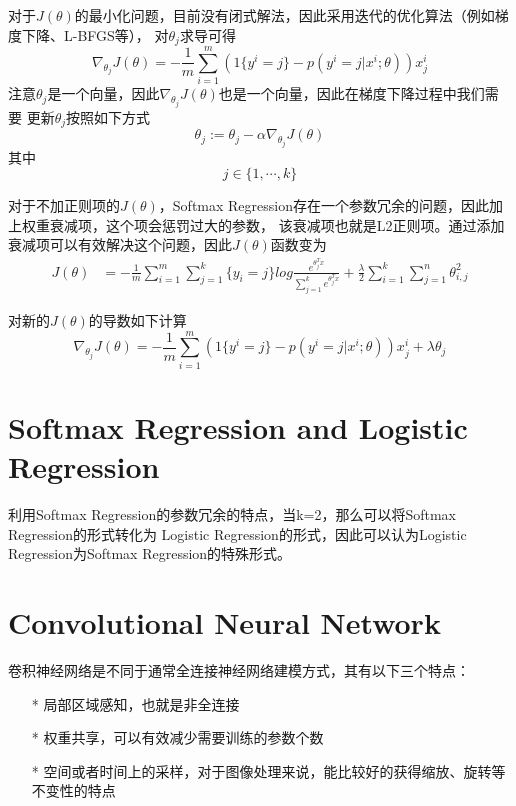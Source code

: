 \documentclass[UTF8]{ctexart}
\begin{document}
\par
对于$J(\theta)$的最小化问题，目前没有闭式解法，因此采用迭代的优化算法（例如梯度下降、L-BFGS等），
对$\theta_j$求导可得
\[ \nabla_{\theta_j}J(\theta) = -\frac{1}{m} \sum_{i=1}^m (1\{y^i=j\}-p(y^i=j|x^i;\theta))x_j^i \]
注意$\theta_j$是一个向量，因此$\nabla_{\theta_j}J(\theta)$也是一个向量，因此在梯度下降过程中我们需要
更新$\theta_j$按照如下方式
\[ \theta_j := \theta_j - \alpha \nabla_{\theta_j} J(\theta) \]
其中\[j \in \{1, \cdots, k\}\]

\par
对于不加正则项的$J(\theta)$，Softmax Regression存在一个参数冗余的问题，因此加上权重衰减项，这个项会惩罚过大的参数，
该衰减项也就是L2正则项。通过添加衰减项可以有效解决这个问题，因此$J(\theta)$函数变为
\begin{align}
J(\theta) &= 
-\frac{1}{m} \sum_{i=1}^m \sum_{j=1}^k \{y_i=j\} log \frac{e^{\theta_j^T x}}{\sum_{j=1}^k e^{\theta_j^T x}}
+ \frac{\lambda}{2} \sum_{i=1}^k \sum_{j=1}^n \theta_{i,j}^2
\end{align}
\par
对新的$J(\theta)$的导数如下计算
\[ \nabla_{\theta_j}J(\theta) = -\frac{1}{m} \sum_{i=1}^m (1\{y^i=j\}-p(y^i=j|x^i;\theta))x_j^i + \lambda \theta_j\]

\section{Softmax Regression and Logistic Regression}
利用Softmax Regression的参数冗余的特点，当k=2，那么可以将Softmax Regression的形式转化为
Logistic Regression的形式，因此可以认为Logistic Regression为Softmax Regression的特殊形式。

\section{Convolutional Neural Network}
卷积神经网络是不同于通常全连接神经网络建模方式，其有以下三个特点：
\begin{itemize}
\item[*] 局部区域感知，也就是非全连接
\item[*] 权重共享，可以有效减少需要训练的参数个数
\item[*] 空间或者时间上的采样，对于图像处理来说，能比较好的获得缩放、旋转等不变性的特点
\end{itemize}
\end{document}
